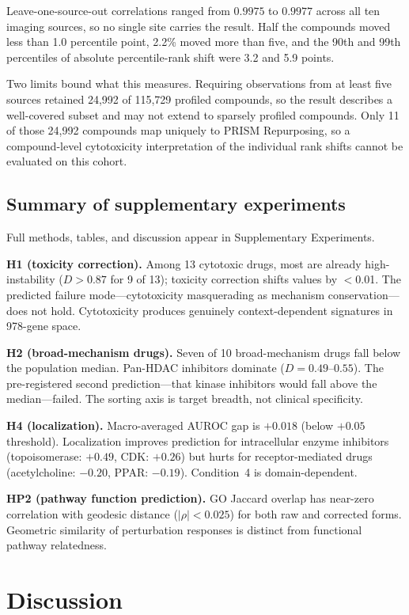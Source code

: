 \documentclass[11pt]{article}
\begin{document}
Leave-one-source-out correlations ranged from $0.9975$ to $0.9977$ across all
ten imaging sources, so no single site carries the result. Half the compounds
moved less than 1.0 percentile point, 2.2\% moved more than five, and the 90th
and 99th percentiles of absolute percentile-rank shift were 3.2 and 5.9 points.

Two limits bound what this measures. Requiring observations from at least five
sources retained 24{,}992 of 115{,}729 profiled compounds, so the result
describes a well-covered subset and may not extend to sparsely profiled
compounds. Only 11 of those 24{,}992 compounds map uniquely to PRISM
Repurposing, so a compound-level cytotoxicity interpretation of the individual
rank shifts cannot be evaluated on this cohort.

\subsection{Summary of supplementary experiments}

Full methods, tables, and discussion appear in Supplementary Experiments.

\textbf{H1 (toxicity correction).} Among 13 cytotoxic drugs, most are already high-instability ($D > 0.87$
for 9 of 13); toxicity correction shifts values by $<$0.01. The predicted
failure mode---cytotoxicity masquerading as mechanism conservation---does
not hold. Cytotoxicity produces genuinely context-dependent signatures in
978-gene space.

\textbf{H2 (broad-mechanism drugs).} Seven of 10 broad-mechanism drugs fall below the population median.
Pan-HDAC inhibitors dominate ($D = 0.49$--$0.55$). The pre-registered
second prediction---that kinase inhibitors would fall above the
median---failed. The sorting axis is target breadth, not clinical
specificity.

\textbf{H4 (localization).} Macro-averaged AUROC gap is $+0.018$ (below $+0.05$ threshold). Localization
improves prediction for intracellular enzyme inhibitors (topoisomerase:
$+0.49$, CDK: $+0.26$) but hurts for receptor-mediated drugs
(acetylcholine: $-0.20$, PPAR: $-0.19$). Condition~4 is domain-dependent.

\textbf{HP2 (pathway function prediction).} GO Jaccard overlap has near-zero correlation with geodesic distance
($|\rho| < 0.025$) for both raw and corrected forms. Geometric similarity
of perturbation responses is distinct from functional pathway relatedness.

\section{Discussion}
\end{document}
